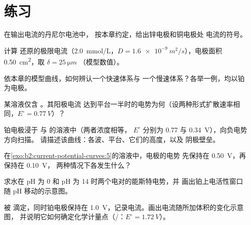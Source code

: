 \section{练习}

\begin{exercise}[$\star$]\label{exo:b2:current-potential-curves:1}
在输出电流的丹尼尔电池中，
按本章约定，给出锌电极和铜电极处
电流的符号。
\end{exercise}

\begin{exercise}[$\star$]\label{exo:b2:current-potential-curves:2}
计算  还原的极限电流（\qty{2.0}{mmol/L}，$D =
\qty{1.6e-9}{m^2/s}$），电极面积 \qty{0.50}{cm^2}，取 $\delta = \qty{25}{\micro m}$
（模型数值）。
\end{exercise}

\begin{exercise}[$\star$]\label{exo:b2:current-potential-curves:3}
依本章的模型曲线，如何辨认一个快速体系与
一个慢速体系？各举一例，均以铂为电极。
\end{exercise}

\begin{exercise}[$\star$]\label{exo:b2:current-potential-curves:4}
某溶液仅含 。其阳极电流
达到平台一半时的电势为何（设两种形式扩散速率相同，$E^\circ = \qty{0.77}{V}$）？
\end{exercise}

\begin{exercise}[$\star\star$]\label{exo:b2:current-potential-curves:5}
铂电极浸于  与  的溶液中（两者浓度相等，
$E^\circ$ 分别为 0.77 与 \qty{0.34}{V}），向负电势方向扫描。
请描述该曲线：各波、平台、它们的高度，以及
阴极壁垒。
\end{exercise}

\begin{exercise}[$\star\star$]\label{exo:b2:current-potential-curves:6}
在\cref{exo:b2:current-potential-curves:5}的溶液中，电极的电势
先保持在 \qty{0.50}{V}，再保持在 \qty{0.10}{V}，
两种情况下各发生什么？
\end{exercise}

\begin{exercise}[$\star\star$]\label{exo:b2:current-potential-curves:7}
求水在 pH 为 0 和 pH 为 14 时两个电对的能斯特电势，并
画出铂上电活性窗口随 pH 移动的示意图。
\end{exercise}

\begin{exercise}[$\star\star$]\label{exo:b2:current-potential-curves:8}
 被  滴定，同时铂电极保持在
\qty{1.0}{V}，记录电流。画出电流随所加体积的变化示意图，
并说明它如何确定化学计量点（/：$E^\circ =
\qty{1.72}{V}$）。
\end{exercise}

